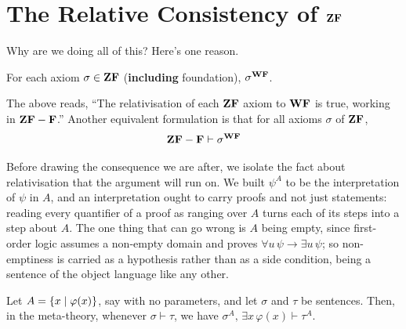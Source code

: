 \section{The Relative Consistency of $\mathbf{ZF}$}

Why are we doing all of this? Here's one reason.

\begin{boxtheorem} \label{Ch3:Thm:ZF_Relativizes_To_WF}
    For each axiom $\sigma \in \mathbf{ZF}$ (\textbf{including} foundation), $\sigma^{\mathbf{WF}}$.
\end{boxtheorem}
The above reads, ``The relativisation of each $\mathbf{ZF}$ axiom to $\mathbf{WF}$ is true, working in $\mathbf{ZF} - \mathbf{F}$.'' Another equivalent formulation is that for all axioms $\sigma$ of $\mathbf{ZF}$,
\begin{align}
    \mathbf{ZF} - \mathbf{F} \vdash \sigma^{\mathbf{WF}}
\end{align}

Before drawing the consequence we are after, we isolate the fact about relativisation that the argument will run on. We built $\psi^A$ to be the interpretation of $\psi$ in $A$, and an interpretation ought to carry proofs and not just statements: reading every quantifier of a proof as ranging over $A$ turns each of its steps into a step about $A$. The one thing that can go wrong is $A$ being empty, since first-order logic assumes a non-empty domain and proves $\forall u \, \psi \to \exists u \, \psi$; so non-emptiness is carried as a hypothesis rather than as a side condition, being a sentence of the object language like any other.

\begin{boxlemma}[Scheme] \label{Ch3:Lemma:Relativization_Preserves_Proofs}
    Let $A = \left\{ x \; \middle\vert \; \varphi(x) \right\}$, say with no parameters, and let $\sigma$ and $\tau$ be sentences. Then, in the meta-theory, whenever $\sigma \vdash \tau$, we have $\sigma^A, \, \exists x \, \varphi(x) \vdash \tau^A$.
\end{boxlemma}

